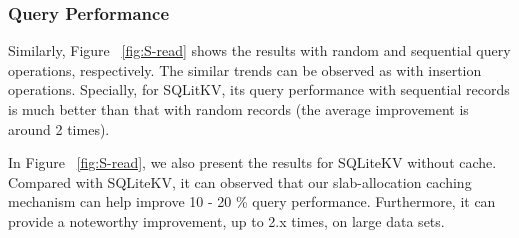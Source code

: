 \subsubsection{Query Performance}
Similarly, Figure ~\ref{fig:S-read} shows the results with random and sequential query operations, respectively. The similar trends can be observed as with insertion operations. Specially, for SQLitKV, its query performance with sequential records is much better than that with random records (the average improvement is around 2 times). 

In Figure ~\ref{fig:S-read}, we also present the results for SQLiteKV without cache. Compared with SQLiteKV, it can observed that our slab-allocation caching mechanism can help improve 10 - 20 \% query performance. Furthermore, it can provide a noteworthy improvement, up to 2.x times, on large data sets.